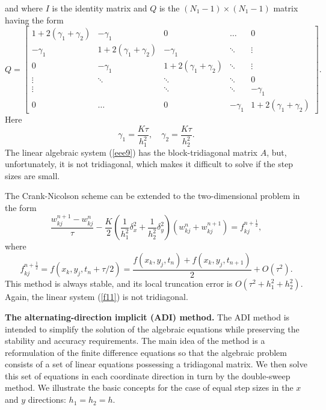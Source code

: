 and where $I$ is the identity matrix and $Q$ is the $(N_{1}-1)\times(N_{1}-1)$ matrix having the form
\begin{equation}
Q=\left[
\begin{array}{cccccc}
1+2(\gamma_{1}+\gamma_{2}) &-\gamma_{1}  &0      &\dots  &0 \\
-\gamma_{1} &1+2(\gamma_{1}+\gamma_{2})  &-\gamma_{1}     &\ddots       &\vdots \\
0  &-\gamma_{1} &1+2(\gamma_{1}+\gamma_{2})      &\ddots       &\vdots \\
\vdots &\ddots &\ddots &\ddots &0 \\
\vdots &       &\ddots &\ddots &-\gamma_{1} \\
0      &\dots  &0      &-\gamma_{1} &1+2(\gamma_{1}+\gamma_{2})
\end{array}\right]. \label{eee11}
\end{equation}
Here
\[
\gamma_{1}=\frac{K\tau}{h_{1}^2}, \quad \gamma_{2}=\frac{K\tau}{h_{2}^2}.
\]
The linear algebraic system (\ref{eee9}) has
the block-tridiagonal matrix $A$, but, unfortunately, it
is not tridiagonal,
which makes it difficult to solve if the step sizes are small.


\vskip 0.3cm  
The Crank-Nicolson scheme can be extended to the two-dimensional problem in the form
\begin{equation}
\frac{w_{kj}^{n+1}-w_{kj}^{n}}{\tau} -\frac{K}{2}
\left(\frac{1}{h_{1}^2}
\delta_{x}^2+\frac{1}{h_{2}^2}\delta_{y}^2\right)
\left(w_{kj}^{n}+w_{kj}^{n+1}\right)=f_{kj}^{n+\frac{1}{2}}, \label{f11}
\end{equation}
where
\[
f_{kj}^{n+\frac{1}{2}}=f(x_{k},y_{j},t_{n}+\tau/2)=\frac{f(x_{k},y_{j},t_{n})+f(x_{k},y_{j},t_{n+1})}{2}+O(\tau^2).
\]
This method is always stable, and its local truncation error is
$O(\tau^2+h_{1}^2+h_{2}^2)$. Again, the linear system (\ref{f11})
is not tridiagonal.


\vskip 0.5cm
 
{\bf The alternating-direction implicit (ADI) method.}
The ADI method is intended to
simplify the solution of the algebraic equations while preserving the stability
and accuracy requirements.
The main idea of the method is a reformulation of the finite difference
equations so that the algebraic problem consists of a set of linear equations
possessing a tridiagonal matrix. We then solve this set of equations in each
coordinate direction in turn by the double-sweep method.
We illustrate the basic concepts for the case of equal step sizes in
the $x$ and $y$ directions:
$h_{1}=h_{2}=h$.

